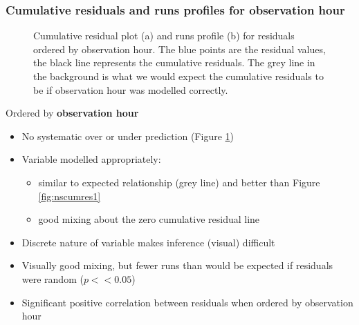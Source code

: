 \begin{frame}[fragile]
\frametitle{Cumulative residuals and runs profiles for observation hour}
\begin{figure}[h!]
  \centering
{}
    \caption{Cumulative residual plot (a) and runs profile (b) for residuals ordered by observation hour. The blue points are the residual values, the black line represents the cumulative residuals. The grey line in the background is what we would expect the cumulative residuals to be if observation hour was modelled correctly.}
  \label{fig:nsgeeruns1}
\end{figure}
\end{frame}

\begin{frame}[fragile]
Ordered by \textbf{observation hour}
\begin{itemize}
\item No systematic over or under prediction (Figure \ref{fig:nsgeeruns1})
\item Variable modelled appropriately:
\begin{itemize}
  \item similar to expected relationship (grey line) and better than Figure \ref{fig:nscumres1}
  \item good mixing about the zero cumulative residual line
\end{itemize}
\item Discrete nature of variable makes inference (visual) difficult
\item Visually good mixing, but fewer runs than would be expected if residuals were random ($p<<0.05$)
\item Significant positive correlation between residuals when ordered by observation hour
\end{itemize}
\end{frame}

